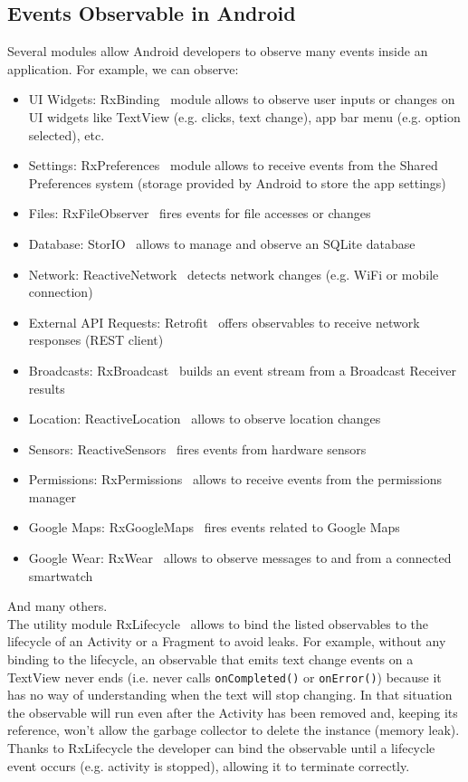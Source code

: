 \documentclass[11pt,a4paper,notitlepage]{article}
\begin{document}
\subsection{Events Observable in Android}
Several modules allow Android developers to observe many events inside an application. For example, we can observe:
\begin{itemize}
	\item UI Widgets: RxBinding~\cite{RxBinding} module allows to observe user inputs or changes on UI widgets like TextView (e.g. clicks, text change), app bar menu (e.g. option selected), etc.
	\item Settings: RxPreferences~\cite{RxPreferences} module allows to receive events from the Shared Preferences system (storage provided by Android to store the app settings)
	\item Files: RxFileObserver~\cite{RxFileObserver} fires events for file accesses or changes
	\item Database: StorIO~\cite{StorIO} allows to manage and observe an SQLite database
	\item Network: ReactiveNetwork~\cite{ReactiveNetwork} detects network changes (e.g. WiFi or mobile connection)
	\item External API Requests: Retrofit~\cite{Retrofit} offers observables to receive network responses (REST client)
	\item Broadcasts: RxBroadcast~\cite{RxBroadcast} builds an event stream from a Broadcast Receiver results
	\item Location: ReactiveLocation~\cite{ReactiveLocation} allows to observe location changes
	\item Sensors: ReactiveSensors~\cite{ReactiveSensors} fires events from hardware sensors
	\item Permissions: RxPermissions~\cite{RxPermissions} allows to receive events from the permissions manager
	\item Google Maps: RxGoogleMaps~\cite{RxGoogleMaps} fires events related to Google Maps
	\item Google Wear: RxWear~\cite{RxWear} allows to observe messages to and from a connected smartwatch
\end{itemize}
And many others.\bigskip \\
The utility module RxLifecycle~\cite{RxLifecycle} allows to bind the listed observables to the lifecycle of an Activity or a Fragment to avoid leaks. For example, without any binding to the lifecycle, an observable that emits text change events on a TextView never ends (i.e. never calls \texttt{onCompleted()} or \texttt{onError()}) because it has no way of understanding when the text will stop changing. In that situation the observable will run even after the Activity has been removed and, keeping its reference, won't allow the garbage collector to delete the instance (memory leak). Thanks to RxLifecycle the developer can bind the observable until a lifecycle event occurs (e.g. activity is stopped), allowing it to terminate correctly.
\end{document}
